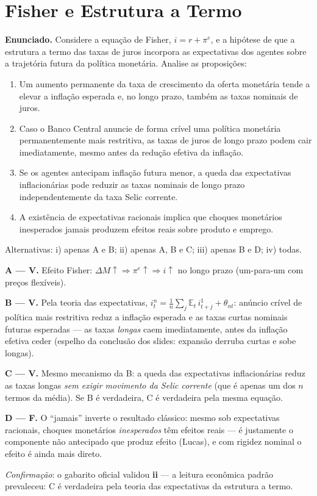 \documentclass[12pt, a4paper]{article}
\newcommand{\E}{\mathbb{E}}
\begin{document}
\section{Fisher e Estrutura a Termo}

\textbf{Enunciado.} Considere a equação de Fisher, $i = r + \pi^e$, e a
hipótese de que a estrutura a termo das taxas de juros incorpora as
expectativas dos agentes sobre a trajetória futura da política monetária.
Analise as proposições:

\begin{enumerate}[label=\Alph*.]
\item Um aumento permanente da taxa de crescimento da oferta monetária tende a
elevar a inflação esperada e, no longo prazo, também as taxas nominais de
juros.
\item Caso o Banco Central anuncie de forma crível uma política monetária
permanentemente mais restritiva, as taxas de juros de longo prazo podem cair
imediatamente, mesmo antes da redução efetiva da inflação.
\item Se os agentes antecipam inflação futura menor, a queda das expectativas
inflacionárias pode reduzir as taxas nominais de longo prazo
independentemente da taxa Selic corrente.
\item A existência de expectativas racionais implica que choques monetários
inesperados jamais produzem efeitos reais sobre produto e emprego.
\end{enumerate}
Alternativas: i) apenas A e B; ii) apenas A, B e C; iii) apenas B e D;
iv) todas.

\begin{correctbox}[title={Resposta: ii) Apenas A, B e C --- confirmada pelo gabarito oficial}]
\textbf{A --- V.} Efeito Fisher: $\Delta M\uparrow \Rightarrow \pi^e\uparrow
\Rightarrow i\uparrow$ no longo prazo (um-para-um com preços flexíveis).

\textbf{B --- V.} Pela teoria das expectativas,
$i^n_t = \frac{1}{n}\sum_j \E_t\,i^1_{t+j} + \theta_{nt}$: anúncio crível de
política mais restritiva reduz a inflação esperada e as taxas curtas nominais
futuras esperadas --- as taxas \emph{longas} caem imediatamente, antes da
inflação efetiva ceder (espelho da conclusão dos slides: expansão derruba
curtas e sobe longas).

\textbf{C --- V.} Mesmo mecanismo da B: a queda das expectativas
inflacionárias reduz as taxas longas \emph{sem exigir movimento da Selic
corrente} (que é apenas um dos $n$ termos da média). Se B é verdadeira, C é
verdadeira pela mesma equação.

\textbf{D --- F.} O ``jamais'' inverte o resultado clássico: mesmo sob
expectativas racionais, choques monetários \emph{inesperados} têm efeitos
reais --- é justamente o componente não antecipado que produz efeito (Lucas),
e com rigidez nominal o efeito é ainda mais direto.

\emph{Confirmação}: o gabarito oficial validou \textbf{ii} --- a leitura
econômica padrão prevaleceu: C é verdadeira pela teoria das expectativas da
estrutura a termo.
\end{correctbox}
\end{document}
